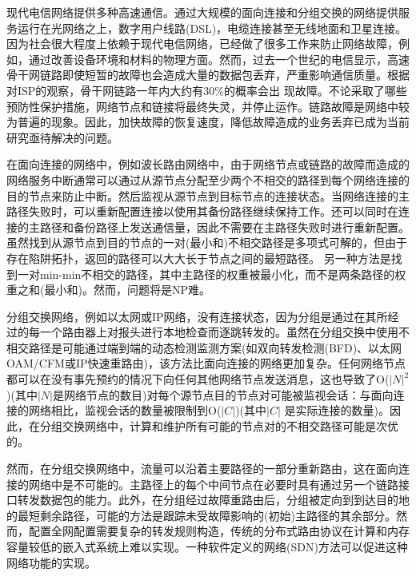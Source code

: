 现代电信网络提供多种高速通信。通过大规模的面向连接和分组交换的网络提供服务运行在光网络之上，数字用户线路(DSL)，电缆连接甚至无线地面和卫星连接。因为社会很大程度上依赖于现代电信网络，已经做了很多工作来防止网络故障，例如，通过改善设备环境和材料的物理方面。然而，过去一个世纪的电信显示，高速骨干网链路即使短暂的故障也会造成大量的数据包丢弃，严重影响通信质量。根据对ISP的观察，骨干网链路一年内大约有30\%的概率会出
现故障\cite{doerr2014all}。不论采取了哪些预防性保护措施，网络节点和链接将最终失灵，并停止运作。链路故障是网络中较为普遍的现象。因此，加快故障的恢复速度，降低故障造成的业务丢弃已成为当前研究亟待解决的问题。

在面向连接的网络中，例如波长路由网络中，由于网络节点或链路的故障而造成的网络服务中断通常可以通过从源节点分配至少两个不相交的路径到每个网络连接的目的节点来防止中断\cite{kuipers2012overview}。然后监视从源节点到目标节点的连接状态。当网络连接的主路径失败时，可以重新配置连接以使用其备份路径继续保持工作。还可以同时在连接的主路径和备份路径上发送通信量，因此不需要在主路径失败时进行重新配置。虽然找到从源节点到目的节点的一对(最小和)不相交路径是多项式可解的\cite{suurballe1974disjoint,suurballe1984quick}，但由于存在陷阱拓扑\cite{dunn1994comparison}，返回的路径可以大大长于节点之间的最短路径\cite{dunn1994comparison}。 另一种方法是找到一对min-min不相交的路径，其中主路径的权重被最小化，而不是两条路径的权重之和(最小和)。然而，问题将是NP难\cite{guo2013finding}。

分组交换网络，例如以太网或IP网络，没有连接状态，因为分组是通过在其所经过的每一个路由器上对报头进行本地检查而逐跳转发的。虽然在分组交换中使用不相交路径是可能通过端到端的动态检测监测方案(如双向转发检测(BFD)\cite{katz2010bidirectional}、以太网OAM/CFM\cite{mcfarland2005ethernet}或IP快速重路由\cite{shand2010ip})，该方法比面向连接的网络更加复杂。任何网络节点都可以在没有事先预约的情况下向任何其他网络节点发送消息，这也导致了O($|N|^2$)(其中$|N|$是网络节点的数目)对每个源节点目的节点对可能被监视会话：与面向连接的网络相比，监视会话的数量被限制到O($|C|$)(其中$|C|$ 是实际连接的数量)。因此，在分组交换网络中，计算和维护所有可能的节点对的不相交路径可能是次优的。



然而，在分组交换网络中，流量可以沿着主要路径的一部分重新路由，这在面向连接的网络中是不可能的。主路径上的每个中间节点在必要时具有通过另一个链路接口转发数据包的能力。此外，在分组经过故障重路由后，分组被定向到到达目的地的最短剩余路径，可能的方法是跟踪未受故障影响的(初始)主路径的其余部分。然而，配置全网配置需要复杂的转发规则构造，传统的分布式路由协议在计算和内存容量较低的嵌入式系统上难以实现。一种软件定义的网络(SDN)方法可以促进这种网络功能的实现。

